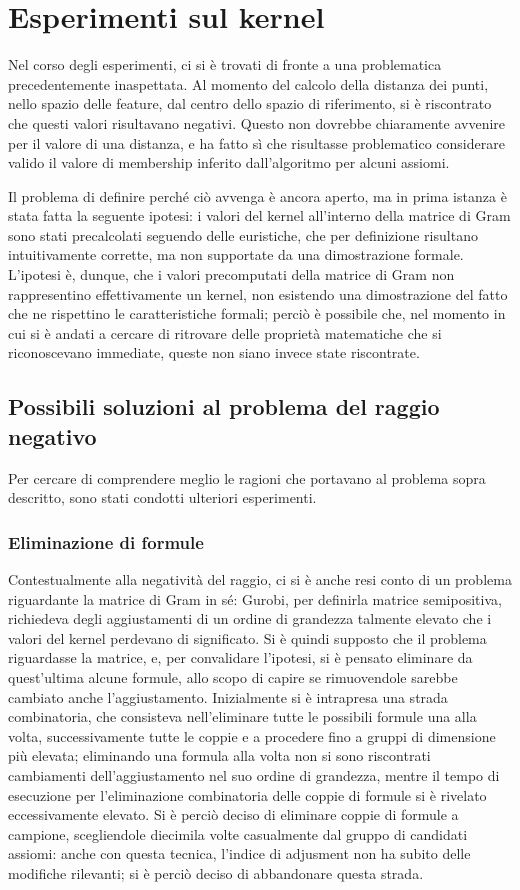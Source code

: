 \documentclass[12pt,a4paper]{report}
\begin{document}
\section{Esperimenti sul kernel}
Nel corso degli esperimenti, ci si è trovati di fronte a una problematica precedentemente inaspettata. 
Al momento del calcolo della distanza dei punti, nello spazio delle feature, dal centro dello spazio di riferimento, si è riscontrato che questi valori risultavano negativi. Questo non dovrebbe chiaramente avvenire per il valore di una distanza, e ha fatto sì che risultasse problematico considerare valido il valore di membership inferito dall'algoritmo per alcuni assiomi.

Il problema di definire perché ciò avvenga è ancora aperto, ma in prima istanza è stata fatta la seguente ipotesi: i valori del kernel all'interno della matrice di Gram sono stati precalcolati seguendo delle euristiche, che per definizione risultano intuitivamente corrette, ma non supportate da una dimostrazione formale. L'ipotesi è, dunque, che i valori precomputati della matrice di Gram non rappresentino effettivamente un kernel, non esistendo una dimostrazione del fatto che ne  rispettino le caratteristiche formali; perciò è possibile che, nel momento in cui si è andati a cercare di ritrovare delle proprietà matematiche che si riconoscevano immediate, queste non siano invece state riscontrate. 


\subsection{Possibili soluzioni al problema del raggio negativo}

Per cercare di comprendere meglio le ragioni che portavano al problema sopra descritto, sono stati condotti ulteriori esperimenti.

\subsubsection{Eliminazione di formule}
Contestualmente alla negatività del raggio, ci si è anche resi conto di un problema riguardante la matrice di Gram in sé: Gurobi, per definirla matrice semipositiva, richiedeva degli aggiustamenti di un ordine di grandezza talmente elevato che i valori del kernel perdevano di significato. Si è quindi supposto che il problema riguardasse la matrice, e, per convalidare l'ipotesi, si è pensato eliminare da quest'ultima alcune formule, allo scopo di capire se rimuovendole sarebbe cambiato anche l'aggiustamento. Inizialmente si è intrapresa una strada combinatoria, che consisteva nell'eliminare tutte le possibili formule una alla volta, successivamente tutte le coppie e a procedere fino a gruppi di dimensione più elevata; eliminando una formula alla volta non si sono riscontrati cambiamenti dell'aggiustamento nel suo ordine di grandezza, mentre il tempo di esecuzione per l'eliminazione combinatoria delle coppie di formule si è rivelato eccessivamente elevato. Si è perciò deciso di eliminare coppie di formule a campione, scegliendole diecimila volte casualmente dal gruppo di candidati assiomi: anche con questa tecnica, l'indice di adjusment non ha subito delle modifiche rilevanti; si è perciò deciso di abbandonare questa strada. 
\end{document}
